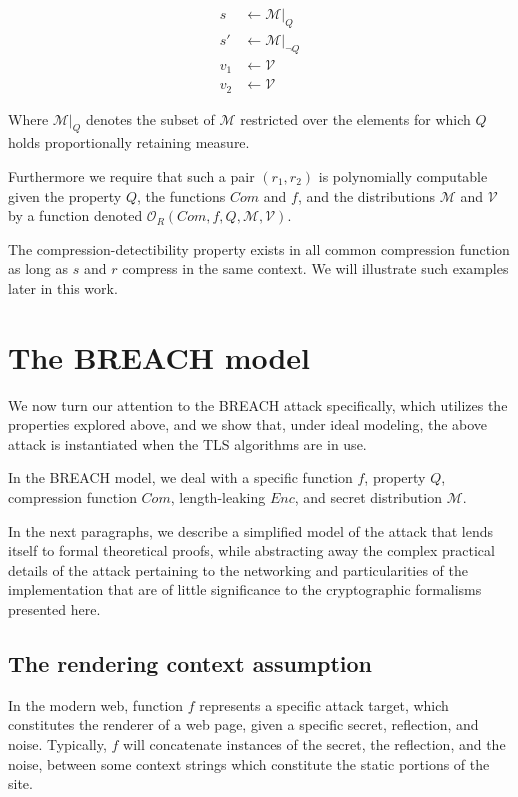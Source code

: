 \documentclass[a4paper, 11 pt, conference]{article}
\begin{document}
\begin{align*}
    s &\leftarrow \mathcal{M}|_Q\\
    s' &\leftarrow \mathcal{M}|_{\lnot Q}\\
    v_1 &\leftarrow \mathcal{V}\\
    v_2 &\leftarrow \mathcal{V}
\end{align*}

Where $\mathcal{M}|_Q$ denotes the subset of $\mathcal{M}$ restricted over the
elements for which $Q$ holds proportionally retaining measure.

Furthermore we require that such a pair $(r_1, r_2)$ is polynomially computable
given the property $Q$, the functions $Com$ and $f$, and the distributions
$\mathcal{M}$ and $\mathcal{V}$ by a function denoted $\mathcal{O}_R(Com, f, Q,
\mathcal{M}, \mathcal{V})$.

The compression-detectibility property exists in all common compression
function as long as $s$ and $r$ compress in the same context. We will
illustrate such examples later in this work.

\section{The BREACH model}\label{sec:breachmodel}
We now turn our attention to the BREACH attack specifically, which utilizes
the properties explored above, and we show that, under ideal modeling,
the above attack is instantiated when the TLS algorithms are in use.

In the BREACH model, we deal with a specific function $f$, property $Q$,
compression function $Com$, length-leaking $Enc$, and secret distribution
$\mathcal{M}$.

In the next paragraphs, we describe a simplified model of the attack that
lends itself to formal theoretical proofs, while abstracting away the complex
practical details of the attack pertaining to the networking and particularities
of the implementation that are of little significance to the cryptographic
formalisms presented here.

\subsection{The rendering context assumption}\label{subsec:rendering}

In the modern web, function $f$ represents a specific attack target, which
constitutes the renderer of a web page, given a specific secret, reflection,
and noise. Typically, $f$ will concatenate instances of the secret, the
reflection, and the noise, between some context strings which constitute the
static portions of the site.
\end{document}
